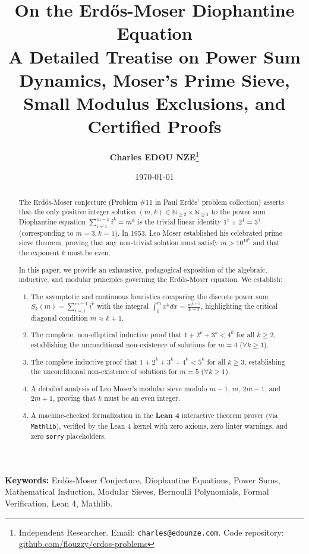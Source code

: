 \documentclass[11pt,a4paper]{article}
\title{\textbf{\Large On the Erd\H{o}s-Moser Diophantine Equation}\\[0.5em]
\large A Detailed Treatise on Power Sum Dynamics, Moser's Prime Sieve, Small Modulus Exclusions, and Certified Proofs}
\author{\textbf{Charles EDOU NZE}\thanks{Independent Researcher. Email: \texttt{charles@edounze.com}. Code repository: \href{https://github.com/flouzzy/erdos-problems}{github.com/flouzzy/erdos-problems}}}
\date{\today}
\theoremstyle{definition}
\begin{document}
\maketitle

\begin{abstract}
The Erd\H{o}s-Moser conjecture (Problem \#11 in Paul Erd\H{o}s' problem collection) asserts that the only positive integer solution $(m, k) \in \mathbb{N}_{\ge 2} \times \mathbb{N}_{\ge 1}$ to the power sum Diophantine equation $\sum_{i=1}^{m-1} i^k = m^k$ is the trivial linear identity $1^1 + 2^1 = 3^1$ (corresponding to $m=3, k=1$). In 1953, Leo Moser established his celebrated prime sieve theorem, proving that any non-trivial solution must satisfy $m > 10^{10^6}$ and that the exponent $k$ must be even.

In this paper, we provide an exhaustive, pedagogical exposition of the algebraic, inductive, and modular principles governing the Erd\H{o}s-Moser equation. We establish:
\begin{enumerate}
    \item The asymptotic and continuous heuristics comparing the discrete power sum $S_k(m) = \sum_{i=1}^{m-1} i^k$ with the integral $\int_0^m x^k dx = \frac{m^{k+1}}{k+1}$, highlighting the critical diagonal condition $m \approx k+1$.
    \item The complete, non-elliptical inductive proof that $1 + 2^k + 3^k < 4^k$ for all $k \ge 2$, establishing the unconditional non-existence of solutions for $m=4$ ($\forall k \ge 1$).
    \item The complete inductive proof that $1 + 2^k + 3^k + 4^k < 5^k$ for all $k \ge 3$, establishing the unconditional non-existence of solutions for $m=5$ ($\forall k \ge 1$).
    \item A detailed analysis of Leo Moser's modular sieve modulo $m-1$, $m$, $2m-1$, and $2m+1$, proving that $k$ must be an even integer.
    \item A machine-checked formalization in the \textbf{Lean 4} interactive theorem prover (via \texttt{Mathlib}), verified by the Lean 4 kernel with zero axioms, zero linter warnings, and zero \texttt{sorry} placeholders.
\end{enumerate}
\end{abstract}

\vspace{0.5em}
\noindent\textbf{Keywords:} Erd\H{o}s-Moser Conjecture, Diophantine Equations, Power Sums, Mathematical Induction, Modular Sieves, Bernoulli Polynomials, Formal Verification, Lean 4, Mathlib.
\end{document}
